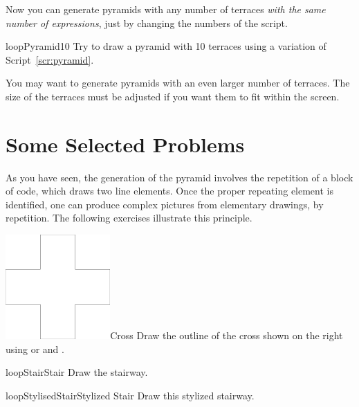 Now you can generate pyramids with any number of
terraces \emph{with the same number of expressions}, just by changing
the numbers of the script.

\begin{exofig}{loopPyramid10} \label{exo:pyramid}
Try to draw a pyramid with 10 terraces using a variation of Script~\ref{scr:pyramid}.
\end{exofig}

You may want to generate pyramids with an even larger number of
terraces. The size of the terraces must be adjusted if you want
them to fit within the screen.

\section{Some Selected Problems}
As you have seen, the generation of the pyramid involves the
repetition of a block of code, which draws two line elements. Once the
proper repeating element is identified, one can produce complex
pictures from elementary drawings, by repetition.  The
following exercises illustrate this principle.

\begin{exofigwithsizeandtitle}{\includegraphics[width=4cm]{loopCross}}{Cross} \label{exo:redcross}
Draw the outline of the cross shown on the right using \turnLeft or \turnRight and
\timesRepeat.
\end{exofigwithsizeandtitle}


\begin{exofigwithtitle}{loopStair}{Stair}\label{exo:stair}
Draw the stairway.
\end{exofigwithtitle}



\begin{exofigwithtitle}{loopStylisedStair}{Stylized Stair}\label{exo:stylizedstair}
Draw this stylized stairway.
\end{exofigwithtitle}

